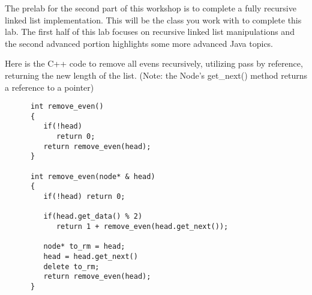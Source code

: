\documentclass[../../main.tex]{subfiles}
\begin{document}
The prelab for the second part of this workshop is to complete a fully
recursive linked list implementation. This will be the class you work
with to complete this lab. The first half of this lab focuses on
recursive linked list manipulations and the second advanced portion
highlights some more advanced Java topics.

\begin{steps}
   \item Here is the C++ code to remove all evens recursively, utilizing pass by reference, returning the
      new length of the list. (Note: the Node's get_next() method returns a reference to a pointer)
      \begin{verbatim}
      int remove_even()
      {
         if(!head)
            return 0;
         return remove_even(head);
      }

      int remove_even(node* & head)
      {
         if(!head) return 0;

         if(head.get_data() % 2)
            return 1 + remove_even(head.get_next());

         node* to_rm = head;
         head = head.get_next()
         delete to_rm;
         return remove_even(head);
      }
      \end{verbatim}


\end{steps}
\end{document}
